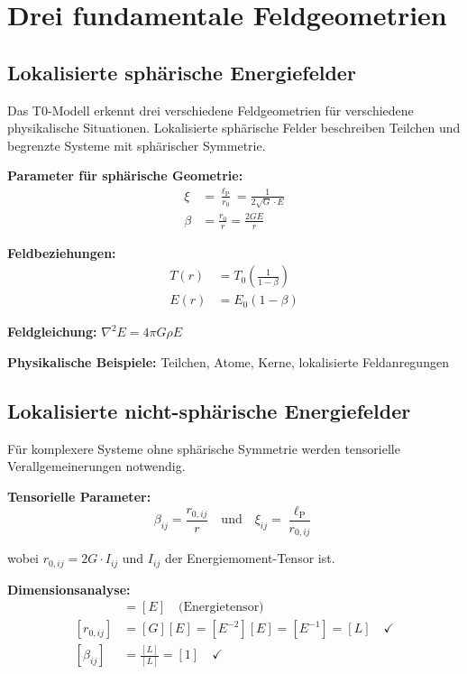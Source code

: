 \documentclass[12pt,a4paper]{report}
\newcommand{\lP}{\ell_{\text{P}}}         %
\newcommand{\rzero}{r_0}                  %
\begin{document}
	\section{Drei fundamentale Feldgeometrien}\label{sec:field_geometries}
	
	\subsection{Lokalisierte sphärische Energiefelder}\label{subsec:localized_spherical}
	
	Das T0-Modell erkennt drei verschiedene Feldgeometrien für verschiedene physikalische Situationen. Lokalisierte sphärische Felder beschreiben Teilchen und begrenzte Systeme mit sphärischer Symmetrie.
	
	\textbf{Parameter für sphärische Geometrie:}
	\begin{align}
		\xi &= \frac{\lP}{\rzero} = \frac{1}{2\sqrt{G} \cdot E} \label{eq:xi_localized}\\
		\beta &= \frac{\rzero}{r} = \frac{2GE}{r} \label{eq:beta_localized}
	\end{align}
	
	\textbf{Feldbeziehungen:}
	\begin{align}
		T(r) &= T_0\left(\frac{1}{1 - \beta}\right) \\
		E(r) &= E_0(1 - \beta)
	\end{align}
	
	\textbf{Feldgleichung:} $\nabla^2 E = 4\pi G \rho E$
	
	\textbf{Physikalische Beispiele:} Teilchen, Atome, Kerne, lokalisierte Feldanregungen
	
	\subsection{Lokalisierte nicht-sphärische Energiefelder}\label{subsec:localized_non_spherical}
	
	Für komplexere Systeme ohne sphärische Symmetrie werden tensorielle Verallgemeinerungen notwendig.
	
	\textbf{Tensorielle Parameter:}
	\begin{equation}
		\beta_{ij} = \frac{r_{0,ij}}{r} \quad \text{und} \quad 	\xi_{ij} = \frac{\lP}{r_{0,ij}}
		\label{eq:tensorial_parameters}
	\end{equation}
	
	wobei $r_{0,ij} = 2G \cdot I_{ij}$ und $I_{ij}$ der Energiemoment-Tensor ist.
	
	\textbf{Dimensionsanalyse:}
	\begin{align}
		[I_{ij}] &= [E] \quad \text{(Energietensor)} \\
		[r_{0,ij}] &= [G][E] = [E^{-2}][E] = [E^{-1}] = [L] \quad \checkmark \\
		[\beta_{ij}] &= \frac{[L]}{[L]} = [1] \quad \checkmark
	\end{align}
	
\end{document}
